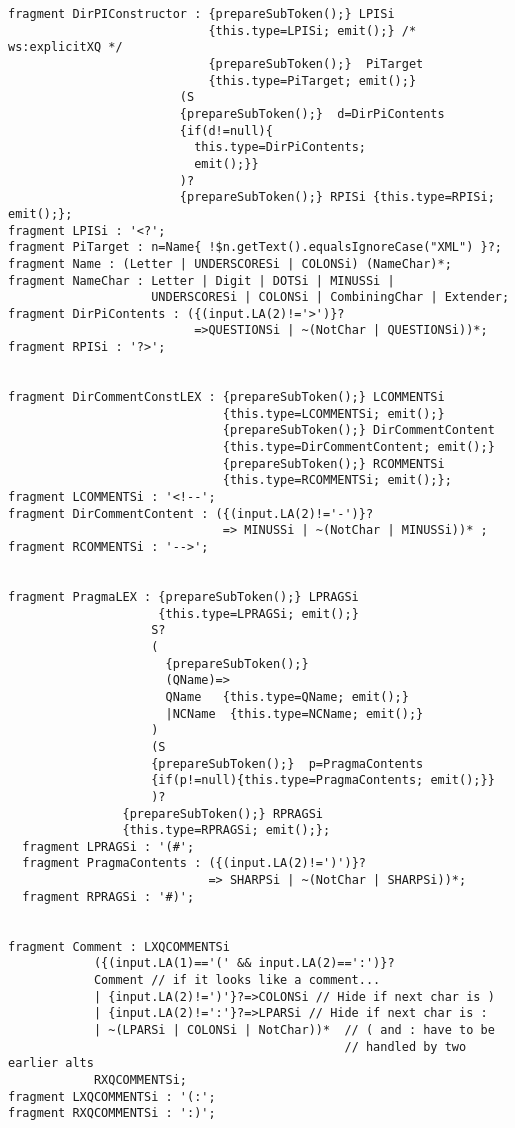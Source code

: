 \begin{verbatim}
fragment DirPIConstructor : {prepareSubToken();} LPISi
                            {this.type=LPISi; emit();} /* ws:explicitXQ */
                            {prepareSubToken();}  PiTarget 
                            {this.type=PiTarget; emit();}
                        (S 
                        {prepareSubToken();}  d=DirPiContents  
                        {if(d!=null){
                          this.type=DirPiContents; 
                          emit();}} 
                        )?
                        {prepareSubToken();} RPISi {this.type=RPISi; emit();};
fragment LPISi : '<?';
fragment PiTarget : n=Name{ !$n.getText().equalsIgnoreCase("XML") }?;
fragment Name : (Letter | UNDERSCORESi | COLONSi) (NameChar)*;
fragment NameChar : Letter | Digit | DOTSi | MINUSSi | 
                    UNDERSCORESi | COLONSi | CombiningChar | Extender;
fragment DirPiContents : ({(input.LA(2)!='>')}?
                          =>QUESTIONSi | ~(NotChar | QUESTIONSi))*;
fragment RPISi : '?>';


fragment DirCommentConstLEX : {prepareSubToken();} LCOMMENTSi
                              {this.type=LCOMMENTSi; emit();}
                              {prepareSubToken();} DirCommentContent
                              {this.type=DirCommentContent; emit();}
                              {prepareSubToken();} RCOMMENTSi
                              {this.type=RCOMMENTSi; emit();};
fragment LCOMMENTSi : '<!--';
fragment DirCommentContent : ({(input.LA(2)!='-')}?
                              => MINUSSi | ~(NotChar | MINUSSi))* ;
fragment RCOMMENTSi : '-->';


fragment PragmaLEX : {prepareSubToken();} LPRAGSi
                     {this.type=LPRAGSi; emit();} 
                    S? 
                    (
                      {prepareSubToken();}
                      (QName)=> 
                      QName   {this.type=QName; emit();}
                      |NCName  {this.type=NCName; emit();}
                    )
                    (S 
                    {prepareSubToken();}  p=PragmaContents  
                    {if(p!=null){this.type=PragmaContents; emit();}}
                    )? 
                {prepareSubToken();} RPRAGSi
                {this.type=RPRAGSi; emit();}; 
  fragment LPRAGSi : '(#';                      
  fragment PragmaContents : ({(input.LA(2)!=')')}?
                            => SHARPSi | ~(NotChar | SHARPSi))*;
  fragment RPRAGSi : '#)';


fragment Comment : LXQCOMMENTSi 
            ({(input.LA(1)=='(' && input.LA(2)==':')}?
            Comment // if it looks like a comment...
            | {input.LA(2)!=')'}?=>COLONSi // Hide if next char is )
            | {input.LA(2)!=':'}?=>LPARSi // Hide if next char is :
            | ~(LPARSi | COLONSi | NotChar))*  // ( and : have to be 
                                               // handled by two earlier alts
            RXQCOMMENTSi;
fragment LXQCOMMENTSi : '(:';
fragment RXQCOMMENTSi : ':)';


\end{verbatim}
